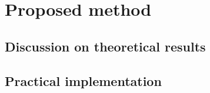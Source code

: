 

\section{Proposed method}\label{sec:method}

\subsection{Discussion on theoretical results}

\subsection{Practical implementation}

